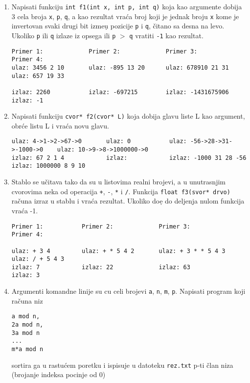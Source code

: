 \begin{enumerate}
\item Napisati funkciju \verb|int f1(int x, int p, int q)| koja kao argumente dobija 3 cela broja \verb|x|,
\verb|p|, \verb|q|, a kao rezultat vra\'ca broj
koji je jednak broju \verb|x| kome je invertovan svaki drugi bit izme\d u pozicije \verb|p| i \verb|q|,
\v citano sa desna na levo. Ukoliko \verb|p| ili \verb|q| izlaze iz opsega ili \verb|p| $>$ \verb|q|
vratiti \verb|-1| kao rezultat.

\begin{verbatim}
Primer 1:             Primer 2:             Primer 3:                 Primer 4:
ulaz: 3456 2 10       ulaz: -895 13 20      ulaz: 678910 21 31        ulaz: 657 19 33

izlaz: 2260           izlaz: -697215        izlaz: -1431675906        izlaz: -1
\end{verbatim}

\item Napisati funkciju \verb|cvor* f2(cvor* L)| koja dobija glavu liste L
kao argument, obr\'ce listu L i vra\'ca novu glavu.

\begin{verbatim}
ulaz: 4->1->2->67->0       ulaz: 0           ulaz: -56->28->31->-1000->0    ulaz: 10->9->8->1000000->0
izlaz: 67 2 1 4            izlaz:            izlaz: -1000 31 28 -56         izlaz: 1000000 8 9 10
\end{verbatim}


\item Stablo se u\v citava tako da su u listovima realni brojevi,
a u unutrasnjim cvorovima neka od operacija \verb|+|, \verb|-|, \verb|*| i \verb|/|.
Funkcija \verb|float f3(svor* drvo)| ra\v cuna izraz u stablu i vra\'ca rezultat. Ukoliko
do\d e do deljenja nulom funkcija vra\'ca -1.


\begin{verbatim}
Primer 1:           Primer 2:             Primer 3:                 Primer 4:

ulaz: + 3 4         ulaz: + * 5 4 2       ulaz: + 3 * * 5 4 3       ulaz: / + 5 4 3
izlaz: 7            izlaz: 22             izlaz: 63                 izlaz: 3
\end{verbatim}


\item Argumenti komandne linije su cu celi brojevi \verb|a|, \verb|n|, \verb|m|, \verb|p|. Napisati program koji ra\v cuna niz
\begin{verbatim}
a mod n,
2a mod n,
3a mod n
...
m*a mod n
\end{verbatim}
sortira ga u rastu\' cem poretku i ispisuje u datoteku \verb|rez.txt| p-ti \v clan niza (brojanje indeksa pocinje od 0)


\end{enumerate}

